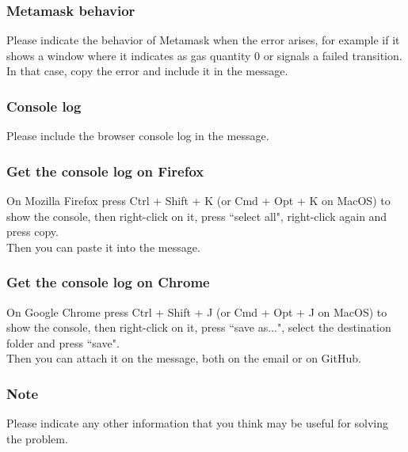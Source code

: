 \documentclass[ManualeUtente]{subfiles}
\begin{document}
\subsubsection{Metamask behavior}
Please indicate the behavior of Metamask when the error arises, for example if it shows a window where it indicates as gas quantity 0 or signals a failed transition. In that case, copy the error and include it in the message.

\subsubsection{Console log}
Please include the browser console log in the message.
\subsubsection{Get the console log on Firefox}
On Mozilla Firefox press Ctrl + Shift + K (or Cmd + Opt + K on MacOS) to show the console, then right-click on it, press ``select all", right-click again and press copy. \\
Then you can paste it into the message.
\subsubsection{Get the console log on Chrome}
On Google Chrome press Ctrl + Shift + J (or Cmd + Opt + J on MacOS) to show the console, then right-click on it, press ``save as...", select the destination folder and press ``save". \\
Then you can attach it on the message, both on the email or on GitHub.

\subsubsection{Note}
Please indicate any other information that you think may be useful for solving the problem.
\end{document}
